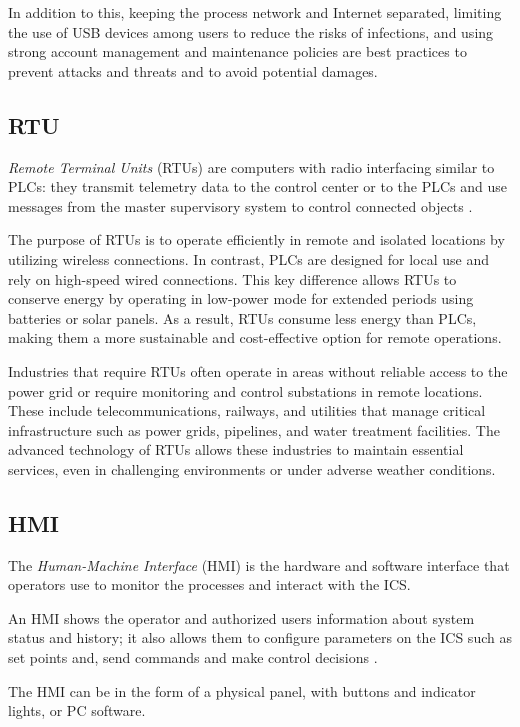 In addition to this, keeping the process network and Internet separated, limiting the use of USB devices among users to reduce the risks of infections, and using strong account management and maintenance policies are best practices to prevent attacks and threats and to avoid potential damages. 

\subsection{RTU}
\label{subsec:rtu}
\textit{Remote Terminal Units} (RTUs) are computers with radio interfacing similar to PLCs: they transmit telemetry data to the control center or to the PLCs and use messages from the master supervisory system to control connected objects \cite{rtu_definition}.

\bigskip
The purpose of RTUs is to operate efficiently in remote and isolated locations by utilizing wireless connections. In contrast, PLCs are designed for local use and rely on high-speed wired connections. This key difference allows RTUs to conserve energy by operating in low-power mode for extended periods using batteries or solar panels. As a result, RTUs consume less energy than PLCs, making them a more sustainable and cost-effective option for remote operations.

\bigskip
Industries that require RTUs often operate in areas without reliable access to the power grid or require monitoring and control substations in remote locations. These include telecommunications, railways, and utilities that manage critical infrastructure such as power grids, pipelines, and water treatment facilities. The advanced technology of RTUs allows these industries to maintain essential services, even in challenging environments or under adverse weather conditions.

\subsection{HMI}
\label{subsec:hmi}
The \textit{Human-Machine Interface} (HMI) is the hardware and software interface that operators use to monitor the processes and interact with the ICS. 

An HMI shows the operator and authorized users information about system status and history; it also allows them to configure parameters on the ICS such as set points and, send commands and make control decisions \cite{hmi_definition}.

The HMI can be in the form of a physical panel, with buttons and indicator lights, or PC software.

